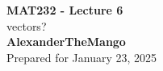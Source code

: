 \begin{titlepage}
    \null %
    \vfill
    \begin{center}
        {\fontsize{40}{48}\selectfont \bfseries MAT232 - Lecture 6}
        \vspace{20pt} \\
        {\LARGE vectors?} \\
        \vspace{20pt}
        \textbf{AlexanderTheMango}
        \vspace{8pt}
        \\ Prepared for January 23, 2025
    \end{center}
    \vfill
\end{titlepage}
